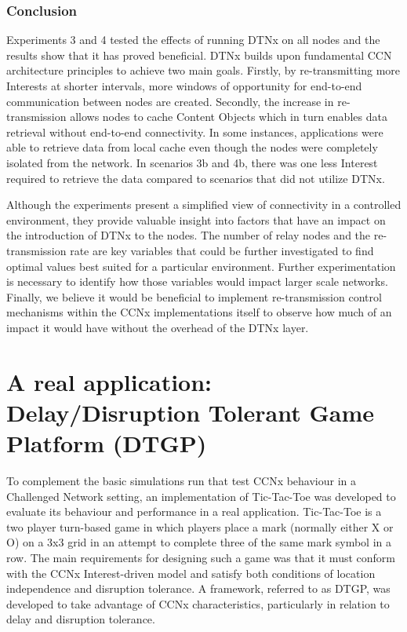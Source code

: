 \documentclass[a4paper,12pt]{report}      %
\begin{document}
\subsection{Conclusion}

Experiments 3 and 4 tested the effects of running DTNx on all nodes and the results show that it has proved beneficial. DTNx builds upon fundamental CCN architecture principles to achieve two main goals. Firstly, by re-transmitting more Interests at shorter intervals, more windows of opportunity for end-to-end communication between nodes are created. Secondly, the increase in re-transmission allows nodes to cache Content Objects which in turn enables data retrieval without end-to-end connectivity. In some instances, applications were able to retrieve data from local cache even though the nodes were completely isolated from the network. In scenarios 3b and 4b, there was one less Interest required to retrieve the data compared to scenarios that did not utilize DTNx. 

Although the experiments present a simplified view of connectivity in a controlled environment, they provide valuable insight into factors that have an impact on the introduction of DTNx to the nodes. The number of relay nodes and the re-transmission rate are key variables that could be further investigated to find optimal values best suited for a particular environment. Further experimentation is necessary to identify how those variables would impact larger scale networks. Finally, we believe it would be beneficial to implement re-transmission control mechanisms within the CCNx implementations itself to observe how much of an impact it would have without the overhead of the DTNx layer.

\pagebreak
\chapter{A real application: Delay/Disruption Tolerant Game Platform (DTGP)}

To complement the basic simulations run that test CCNx behaviour in a Challenged Network setting, an
implementation of Tic-Tac-Toe was developed to evaluate its behaviour and performance in a real
application. Tic-Tac-Toe is a two player turn-based game in which players place a mark (normally either X or O)
 on a 3x3 grid in an attempt to complete three of the same mark symbol in a row. 
The main requirements for designing such a game was that it must conform with the
CCNx Interest-driven model and satisfy both conditions of location independence and disruption
tolerance. A framework, referred to as DTGP, was developed to take advantage of CCNx characteristics, 
particularly in relation to delay and disruption tolerance.
\end{document}
